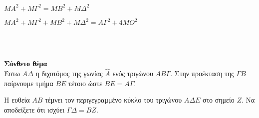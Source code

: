 \documentclass[ektypwsh]{diag-xelatex}
\begin{document}
\begin{thema}
{\begin{rlist}
\item $ MA^2+M\varGamma^2=MB^2+M\varDelta^2 $
\item $ MA^2+M\varGamma^2+MB^2+M\varDelta^2=A\varGamma^2+4MO^2 $
\end{rlist}}\mbox{}\\\\
\item \textbf{Σύνθετο θέμα}\\
Έστω $ A\varDelta $ η διχοτόμος της γωνίας $ \hat{A} $ ενός τριγώνου $ AB\varGamma $. Στην προέκταση της $ \varGamma B $ παίρνουμε τμήμα $ BE $ τέτοιο ώστε $ BE=A\varGamma $.
\begin{center}
\end{center}
Η ευθεία $ AB $ τέμνει τον περιγεγραμμένο κύκλο του τριγώνου $ A\varDelta E $ στο σημείο $ Z $. Να αποδείξετε ότι ισχύει $ \varGamma\varDelta=BZ $.
\end{thema}
\end{document}
